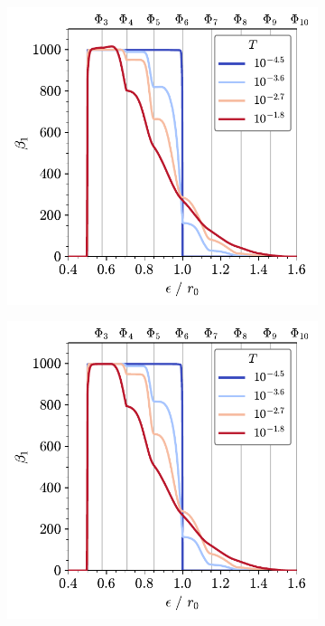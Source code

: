 \begin{figure}[tb]
	\centering
     
      \begin{subfigure}[b]{0.48\textwidth}
         \centering
         \includegraphics[width=\textwidth]{./figures/ph/tri_raft_beta1_full.pdf}
         \caption{}
         \label{fig:trbettia}
     \end{subfigure}
     \hfill
     \begin{subfigure}[b]{0.48\textwidth}
         \centering
         \includegraphics[width=\textwidth]{./figures/ph/tri_raft_beta1_cut.pdf}
         \caption{}
         \label{fig:trbettib}
     \end{subfigure}


\end{figure}
